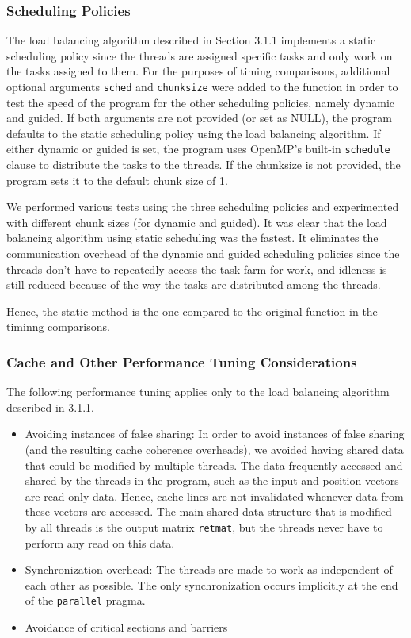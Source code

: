 \subsubsection{Scheduling Policies}
The load balancing algorithm described in Section 3.1.1 implements a static scheduling policy since the threads are assigned specific tasks and only work on the tasks assigned to them. For the purposes of timing comparisons, additional optional arguments \texttt{sched} and \texttt{chunksize} were added to the function in order to test the speed of the program for the other scheduling policies, namely dynamic and guided. If both arguments are not provided (or set as NULL), the program defaults to the static scheduling policy using the load balancing algorithm. If either dynamic or guided is set, the program uses OpenMP's built-in \texttt{schedule} clause to distribute the tasks to the threads. If the chunksize is not provided, the program sets it to the default chunk size of 1.\\
\null

We performed various tests using the three scheduling policies and experimented with different chunk sizes (for dynamic and guided). It was clear that the load balancing algorithm using static scheduling was the fastest. It eliminates the communication overhead of the dynamic and guided scheduling policies since the threads don't have to repeatedly access the task farm for work, and idleness is still reduced because of the way the tasks are distributed among the threads.\\
\null

Hence, the static method is the one compared to the original function in the timinng comparisons.

\subsubsection{Cache and Other Performance Tuning Considerations}
The following performance tuning applies only to the load balancing algorithm described in 3.1.1.

\begin{itemize}
\item Avoiding instances of false sharing: In order to avoid instances of false sharing (and the resulting cache coherence overheads), we avoided having shared data that could be modified by multiple threads. The data frequently accessed and shared by the threads in the program, such as the input and position vectors are read-only data. Hence, cache lines are not invalidated whenever data from these vectors are accessed. The main shared data structure that is modified by all threads is the output matrix \texttt{retmat}, but the threads never have to perform any read on this data.

\item Synchronization overhead: The threads are made to work as independent of each other as possible. The only synchronization occurs implicitly at the end of the \texttt{parallel} pragma.

\item Avoidance of critical sections and barriers

\end{itemize}



